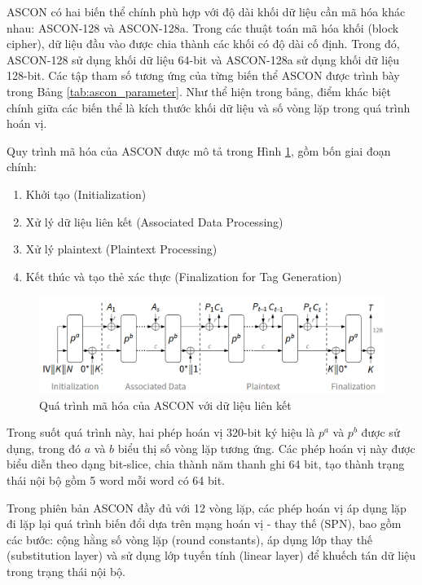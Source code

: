 ASCON có hai biến thể chính phù hợp với độ dài khối dữ liệu cần mã hóa khác nhau: ASCON-128 và ASCON-128a. Trong các thuật toán mã hóa khối (block cipher), dữ liệu đầu vào được chia thành các khối có độ dài cố định. Trong đó, ASCON-128 sử dụng khối dữ liệu 64-bit và ASCON-128a sử dụng khối dữ liệu 128-bit. Các tập tham số tương ứng của từng biến thể ASCON được trình bày trong Bảng \ref{tab:ascon_parameter}. Như thể hiện trong bảng, điểm khác biệt chính giữa các biến thể là kích thước khối dữ liệu và số vòng lặp trong quá trình hoán vị.

Quy trình mã hóa của ASCON được mô tả trong Hình \ref{fig:ascon_process}, gồm bốn giai đoạn chính:
\begin{enumerate}
    \item Khởi tạo (Initialization)
    \item Xử lý dữ liệu liên kết (Associated Data Processing)
    \item Xử lý plaintext (Plaintext Processing)
    \item Kết thúc và tạo thẻ xác thực (Finalization for Tag Generation)
\end{enumerate}

\begin{figure}
    \centering
    \includegraphics[width=0.9\linewidth]{ascon_process.png}
    \caption{Quá trình mã hóa của ASCON với dữ liệu liên kết}
    \label{fig:ascon_process}
\end{figure}

Trong suốt quá trình này, hai phép hoán vị 320-bit ký hiệu là $p^a$ và $p^b$ được sử dụng, trong đó $a$ và $b$ biểu thị số vòng lặp tương ứng. Các phép hoán vị này được biểu diễn theo dạng bit-slice, chia thành năm thanh ghi 64 bit, tạo thành trạng thái nội bộ gồm 5 word mỗi word có 64 bit.

Trong phiên bản ASCON đầy đủ với 12 vòng lặp, các phép hoán vị áp dụng lặp đi lặp lại quá trình biến đổi dựa trên mạng hoán vị - thay thế (SPN), bao gồm các bước: cộng hằng số vòng lặp (round constants), áp dụng lớp thay thế (substitution layer) và sử dụng lớp tuyến tính (linear layer) để khuếch tán dữ liệu trong trạng thái nội bộ.

